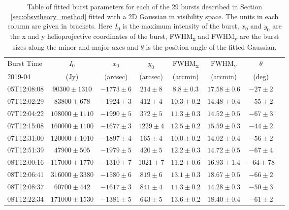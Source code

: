 \begin{table}
\centering
\caption[Table of burst parameters from direct fitting to interferometric visibilities.]{Table of fitted burst parameters for each of the 29 bursts described in Section \ref{sec:obsvtheory_method} fitted with a 2D Gaussian in visibility space. The units in each column are given in brackets. Here $I_0$ is the maximum intensity of the burst, $x_0$ and $y_0$ are the x and y helioprojective coordinates of the burst, FWHM\textsubscript{x} and FWHM\textsubscript{y} are the burst sizes along the minor and major axes and $\theta$ is the position angle of the fitted Gaussian.}
\label{tab:dataset}
\begin{tabular}{lcccccc p{\columnwidth}}
\toprule
Burst Time & $I_0$  & $x_0$ & $y_0$  & FWHM\textsubscript{x} & FWHM\textsubscript{y} & $\theta$ \\
 2019-04 & (Jy) & (arcsec) & (arcsec) & (arcmin) & (arcmin) &  (deg) \\
\midrule
05T12:08:08 &  $ 90300 \pm 1310$ & $-1773 \pm 6$  & $  214 \pm 8$  &  $  8.8 \pm 0.3$ &  $ 17.58 \pm 0.6$ & $ -27 \pm 2$ \\
07T12:02:29 &  $ 83800 \pm  678$ & $-1924 \pm 3$  & $  412 \pm 4$  &  $ 10.3 \pm 0.2$ &  $ 14.48 \pm 0.4$ & $ -55 \pm 2$ \\
07T12:04:22 &  $108000 \pm 1110$ & $-1990 \pm 5$  & $  372 \pm 5$  &  $ 11.3 \pm 0.3$ &  $ 14.52 \pm 0.5$ & $ -67 \pm 3$ \\
07T12:15:08 &  $160000 \pm 1100$ & $-1677 \pm 3$  & $ 1229 \pm 4$  &  $ 12.5 \pm 0.2$ &  $ 15.59 \pm 0.3$ & $ -44 \pm 2$ \\
07T12:31:00 &  $120000 \pm 1010$ & $-1897 \pm 4$  & $  165 \pm 4$  &  $ 10.0 \pm 0.2$ &  $ 14.02 \pm 0.4$ & $ -56 \pm 2$ \\
07T12:51:39 &  $ 47900 \pm  505$ & $-1979 \pm 5$  & $  420 \pm 5$  &  $ 12.2 \pm 0.3$ &  $ 14.72 \pm 0.5$ & $ -67 \pm 4$ \\
08T12:00:16 &  $117000 \pm 1770$ & $-1310 \pm 7$  & $ 1021 \pm 7$  &  $ 11.2 \pm 0.6$ &  $ 16.93 \pm 1.4$ & $ -64 \pm 78$ \\
08T12:06:41 &  $316000 \pm 3380$ & $-1580 \pm 6$  & $  819 \pm 6$  &  $ 13.1 \pm 0.3$ &  $ 18.67 \pm 0.5$ & $ -66 \pm 2$ \\
08T12:08:37 &  $ 60700 \pm  442$ & $-1617 \pm 3$  & $  841 \pm 4$  &  $ 11.3 \pm 0.2$ &  $ 14.28 \pm 0.3$ & $ -50 \pm 3$ \\
08T12:22:34 &  $171000 \pm 1530$ & $-1381 \pm 5$  & $  643 \pm 5$  &  $ 13.6 \pm 0.2$ &  $ 18.40 \pm 0.4$ & $ -61 \pm 2$ \\

\end{tabular}
\end{table}
